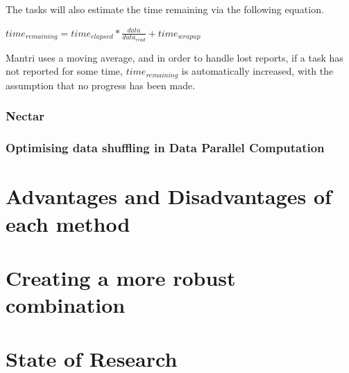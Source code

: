 \documentclass[]{article}
\begin{document}
The tasks will also estimate the time remaining via the following equation. 

$time_{remaining} = time_{elapsed} * \frac{data}{data_{read}} + time_{wrapup}$

Mantri uses a moving average, and in order to handle lost reports, if a task has not reported for some time, $time_{remaining}$ is automatically increased, with the assumption that no progress has been made.

\subsubsection{Nectar}

\subsubsection{Optimising data shuffling in Data Parallel Computation}

\section{Advantages and Disadvantages of each method}
\subsection{}

\subsection{}

\subsection{}

\subsection{}

\subsection{}

\section{Creating a more robust combination}

\section{State of Research}
\end{document}
